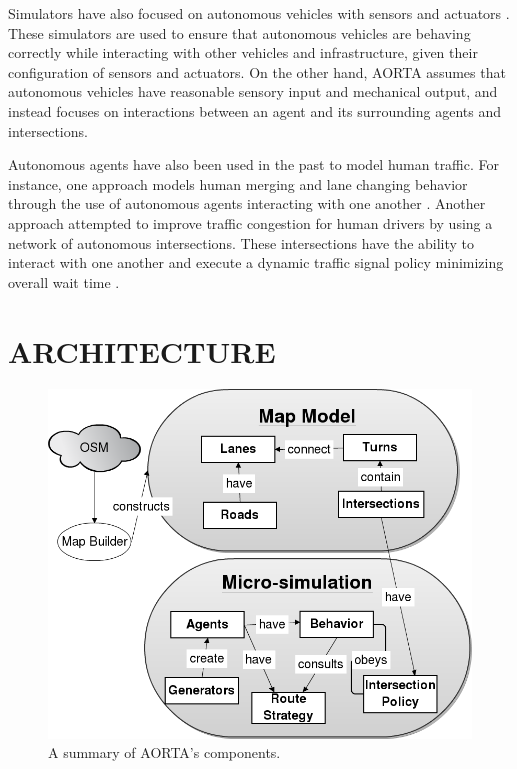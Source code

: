 \documentclass[letterpaper, 10 pt, conference]{ieeeconf}  %
\begin{document}
Simulators have also focused on autonomous vehicles with sensors and actuators
\cite{figueiredo2009approach}. These simulators are used to ensure that
autonomous vehicles are behaving correctly while interacting with other
vehicles and infrastructure, given their configuration of sensors and
actuators. On the other hand, AORTA assumes that autonomous vehicles have
reasonable sensory input and mechanical output, and instead focuses on
interactions between an agent and its surrounding agents and intersections.

Autonomous agents have also been used in the past to model human traffic. For
instance, one approach models human merging and lane changing behavior through
the use of autonomous agents interacting with one another
\cite{hidas2002modelling}. Another approach attempted to improve traffic
congestion for human drivers by using a network of autonomous intersections.
These intersections have the ability to interact with one another and execute a
dynamic traffic signal policy minimizing overall wait time
\cite{manikonda2001autonomous}.


\section{ARCHITECTURE}
\label{sec:arch}

\begin{figure}
  \centering \includegraphics[scale=0.3]{architecture.png}
  \caption{A summary of AORTA's components.}
  \label{fig:arch}
  \vspace{-20pt}
\end{figure}
\end{document}
